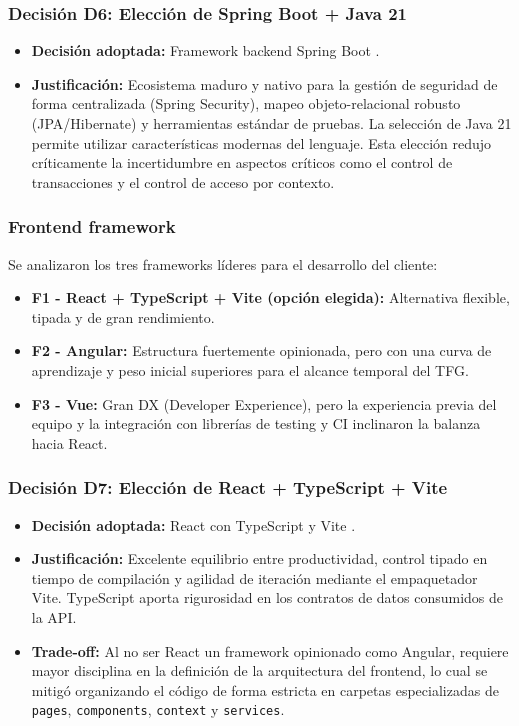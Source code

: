 \subsubsection*{Decisi\'on D6: Elecci\'on de Spring Boot + Java 21}
\begin{itemize}
    \item \textbf{Decisi\'on adoptada:} Framework backend Spring Boot \cite{springbootdocs}.
    \item \textbf{Justificaci\'on:} Ecosistema maduro y nativo para la gesti\'on de seguridad de forma centralizada (Spring Security), mapeo objeto-relacional robusto (JPA/Hibernate) y herramientas est\'andar de pruebas. La selecci\'on de Java 21 permite utilizar caracter\'isticas modernas del lenguaje. Esta elecci\'on redujo cr\'iticamente la incertidumbre en aspectos cr\'iticos como el control de transacciones y el control de acceso por contexto.
\end{itemize}

\subsubsection*{Frontend framework}
Se analizaron los tres frameworks l\'ideres para el desarrollo del cliente:
\begin{itemize}
    \item \textbf{F1 - React + TypeScript + Vite (opci\'on elegida):} Alternativa flexible, tipada y de gran rendimiento.
    \item \textbf{F2 - Angular:} Estructura fuertemente opinionada, pero con una curva de aprendizaje y peso inicial superiores para el alcance temporal del TFG.
    \item \textbf{F3 - Vue:} Gran DX (Developer Experience), pero la experiencia previa del equipo y la integraci\'on con librer\'ias de testing y CI inclinaron la balanza hacia React.
\end{itemize}

\subsubsection*{Decisi\'on D7: Elecci\'on de React + TypeScript + Vite}
\begin{itemize}
    \item \textbf{Decisi\'on adoptada:} React \cite{reactdocs} con TypeScript \cite{typescript} y Vite \cite{vite}.
    \item \textbf{Justificaci\'on:} Excelente equilibrio entre productividad, control tipado en tiempo de compilaci\'on y agilidad de iteraci\'on mediante el empaquetador Vite. TypeScript aporta rigurosidad en los contratos de datos consumidos de la API.
    \item \textbf{Trade-off:} Al no ser React un framework opinionado como Angular, requiere mayor disciplina en la definici\'on de la arquitectura del frontend, lo cual se mitig\'o organizando el c\'odigo de forma estricta en carpetas especializadas de \texttt{pages}, \texttt{components}, \texttt{context} y \texttt{services}.
\end{itemize}

